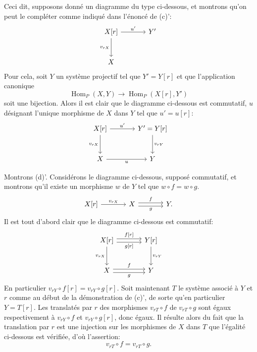 \documentclass[11pt]{article}
\DeclareMathOperator{\Hom}{Hom}
\providecommand{\Hom}{\operatorname{Hom}}
\providecommand{\Hom}{\operatorname{Hom}}
\begin{document}
Ceci dit, supposons donné un diagramme du type ci-dessous, et montrons qu'on peut le compléter comme indiqué dans l'énoncé de (c)':
\[
\begin{tikzcd}[column sep=large,row sep=large]
X[r] \arrow[r,"u'"] \arrow[d,"{v_{rX}}"'] & Y'\\
X
\end{tikzcd}
\]
Pour cela, soit $Y$ un système projectif tel que $Y'=Y[r]$ et que l'application canonique
\[
\Hom_P(X,Y)\longrightarrow\Hom_P(X[r],Y')
\]
soit une bijection. Alors il est clair que le diagramme ci-dessous est commutatif, $u$ désignant l'unique morphisme de $X$ dans $Y$ tel que $u'=u[r]$:
\[
\begin{tikzcd}[column sep=large,row sep=large]
X[r] \arrow[r,"u'"] \arrow[d,"{v_{rX}}"'] & Y'=Y[r] \arrow[d,"{v_{rY}}"]\\
X \arrow[r,"u"'] & Y
\end{tikzcd}
\]

Montrons (d)'. Considérons le diagramme ci-dessous, supposé commutatif, et montrons qu'il existe un morphisme $w$ de $Y$ tel que $w\circ f=w\circ g$.
\[
\begin{tikzcd}[column sep=large]
X[r] \arrow[r,"{v_{rX}}"] & X \arrow[r,shift left,"f"] \arrow[r,shift right,"g"'] & Y .
\end{tikzcd}
\]
Il est tout d'abord clair que le diagramme ci-dessous est commutatif:
\[
\begin{tikzcd}[column sep=large,row sep=large]
X[r] \arrow[r,shift left,"{f[r]}"] \arrow[r,shift right,"{g[r]}"'] \arrow[d,"{v_{rX}}"'] & Y[r] \arrow[d,"{v_{rY}}"]\\
X \arrow[r,shift left,"f"] \arrow[r,shift right,"g"'] & Y
\end{tikzcd}
\]
En particulier $v_{rY}\circ f[r]=v_{rY}\circ g[r]$. Soit maintenant $T$ le système associé à $Y$ et $r$ comme au début de la démonstration de (c)', de sorte qu'en
particulier $Y=T[r]$. Les translatés par $r$ des morphismes $v_{rT}\circ f$ de $v_{rT}\circ g$ sont égaux respectivement à $v_{rY}\circ f$ et $v_{rY}\circ g[r]$, donc égaux. Il résulte alors du fait que la translation par $r$ est une injection sur les morphismes de $X$ dans $T$ que l'égalité ci-dessous est vérifiée, d'où l'assertion:
\[
v_{rT}\circ f=v_{rT}\circ g.
\]
\end{document}
